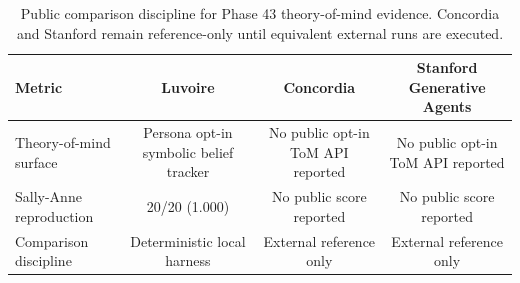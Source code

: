 \begin{table}[h]
\centering
\begin{tabular}{lccc}
\toprule
Metric & Luvoire & Concordia & Stanford Generative Agents \\
\midrule
Theory-of-mind surface & Persona opt-in symbolic belief tracker & No public opt-in ToM API reported & No public opt-in ToM API reported \\
Sally-Anne reproduction & 20/20 (1.000) & No public score reported & No public score reported \\
Comparison discipline & Deterministic local harness & External reference only & External reference only \\
\bottomrule
\end{tabular}
\caption{Public comparison discipline for Phase 43 theory-of-mind evidence. Concordia and Stanford remain reference-only until equivalent external runs are executed.}
\label{tab:theory-of-mind-summary}
\end{table}
